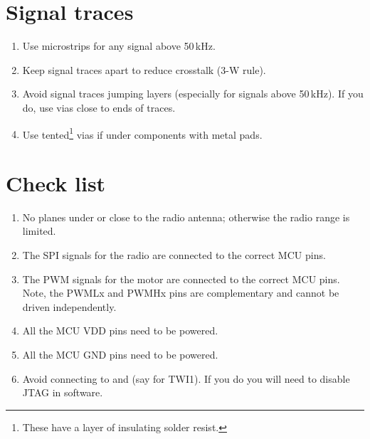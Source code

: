 \section{Signal traces}

\begin{enumerate}

  
\item
  Use microstrips for any signal above 50\,kHz.

\item
  Keep signal traces apart to reduce crosstalk (3-W rule).

\item
  Avoid signal traces jumping layers (especially for signals above
  50\,kHz).  If you do, use vias close to ends of traces.

\item
  Use tented\footnote{These have a layer of insulating solder resist.}
  vias if under components with metal pads.
  
\end{enumerate}


\section{Check list}\label{check-list}

\begin{enumerate}
\item
  No planes under or close to the radio antenna; otherwise the radio
  range is limited.
\item
  The SPI signals for the radio are connected to the correct MCU pins.
\item
  The PWM signals for the motor are connected to the correct MCU pins.
  Note, the PWMLx and PWMHx pins are complementary and cannot be driven
  independently.
\item
  All the MCU VDD pins need to be powered.
\item
  All the MCU GND pins need to be powered.
\item
  Avoid connecting to  and  (say for TWI1).  If you
  do you will need to disable JTAG in software.
\end{enumerate}


